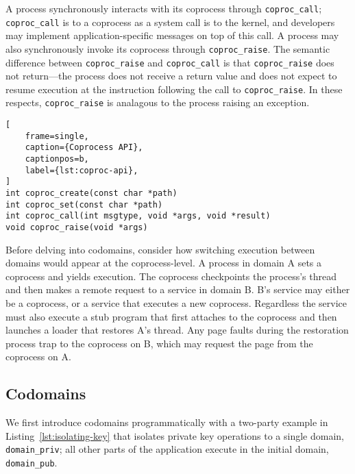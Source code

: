 A process synchronously interacts with its coprocess through
\texttt{coproc\_call}; \texttt{coproc\_call} is to a coprocess as a system call
is to the kernel, and developers may implement application-specific messages
on top of this call.
%
A process may also synchronously invoke its coprocess through
\texttt{coproc\_raise}.
%
The semantic difference between \texttt{coproc\_raise} and
\texttt{coproc\_call} is that \texttt{coproc\_raise} does not return---the
process does not receive a return value and does not expect to resume
execution at the instruction following the call to \texttt{coproc\_raise}.
%
In these respects, \texttt{coproc\_raise} is analagous to the process raising
an exception.

\begin{lstlisting}[
    frame=single, 
    caption={Coprocess API},
    captionpos=b,
    label={lst:coproc-api},
]
int coproc_create(const char *path)
int coproc_set(const char *path)
int coproc_call(int msgtype, void *args, void *result)
void coproc_raise(void *args)
\end{lstlisting}


%


%
Before delving into codomains, consider how switching execution between domains
would appear at the coprocess-level.
%
A process in domain A sets a coprocess and yields execution.
%
The coprocess checkpoints the process's thread and then makes a remote request
to a service in domain B\@.
%
B's service may either be a coprocess, or a service that executes a new
coprocess.
%
Regardless the service must also execute a stub program that first attaches to the
coprocess and then launches a loader that restores A's thread.
%
Any page faults during the restoration process trap to the coprocess on B,
which may request the page from the coprocess on A.


\subsection{Codomains}

We first introduce codomains programmatically with a two-party example in
Listing~\ref{lst:isolating-key} that isolates private key operations to a
single domain, \texttt{domain\_priv}; all other parts of the application
execute in the initial domain, \texttt{domain\_pub}.

